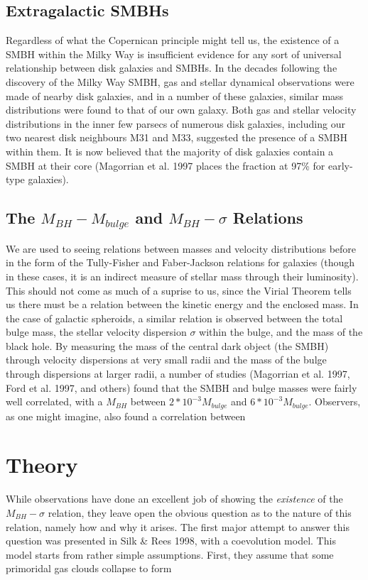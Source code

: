 \documentclass[12pt]{article}
\begin{document}
\subsection{Extragalactic SMBHs}
Regardless of what the Copernican principle might tell us, the existence of a
SMBH within the Milky Way is insufficient evidence for any sort of universal
relationship between disk galaxies and SMBHs.  In the decades following the 
discovery of the Milky Way SMBH, gas and stellar dynamical observations were 
made of nearby disk galaxies, and in a number of these galaxies, similar mass
distributions were found to that of our own galaxy.  Both gas and stellar 
velocity distributions in the inner few parsecs of numerous disk
galaxies, including our two nearest disk neighbours M31 and M33, suggested the
presence of a SMBH within them.  It is now believed that the majority of disk
galaxies contain a SMBH at their core (Magorrian et al. 1997 places the fraction
at 97\% for early-type galaxies).

\subsection{The $M_{BH}-M_{bulge}$ and $M_{BH}-\sigma$ Relations}
We are used to seeing relations between masses and velocity distributions before
in the form of the Tully-Fisher and Faber-Jackson relations for galaxies (though
in these cases, it is an indirect measure of stellar mass through their 
luminosity).  This should not come as much of a suprise to us, since the 
Virial Theorem tells us there must be a relation between the kinetic energy and
the enclosed mass.  In the case of galactic spheroids, a similar relation is 
observed between the total bulge mass, the stellar velocity dispersion $\sigma$
within the bulge, and the mass of the black hole. By measuring the mass of the
central dark object (the SMBH) through velocity dispersions at very small 
radii and the mass of the bulge through dispersions at larger radii, a number
of studies (Magorrian et al. 1997, Ford et al. 1997, and others) found that the
SMBH and bulge masses were fairly well correlated, with a $M_{BH}$ between
$2*10^{-3}M_{bulge}$ and $6*10^{-3}M_{bulge}$.  Observers, as one might imagine,
also found a correlation between 

\section{Theory}
While observations have done an excellent job of showing the \textit{existence}
of the $M_{BH}-\sigma$ relation, they leave open the obvious question as to the
nature of this relation, namely how and why it arises.  The first major attempt
to answer this question was presented in Silk \& Rees 1998, with a coevolution 
model.  This model starts from rather simple assumptions.  First, they assume
that some primoridal gas clouds collapse to form 
\end{document}
